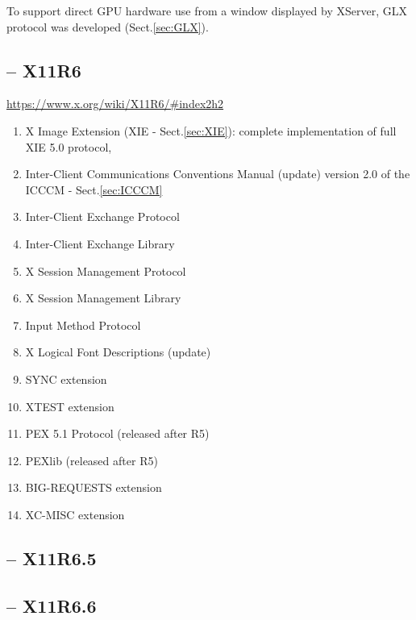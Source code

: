 To support direct GPU hardware use from a window displayed by XServer,
GLX protocol was developed (Sect.\ref{sec:GLX}). 

\subsection{-- X11R6}
\label{sec:X11R6}

\url{https://www.x.org/wiki/X11R6/#index2h2}

\begin{enumerate}
  \item  X Image Extension (XIE - Sect.\ref{sec:XIE}):
  complete implementation of full XIE 5.0 protocol,
  
  \item Inter-Client Communications Conventions Manual (update)
  version 2.0 of the ICCCM - Sect.\ref{sec:ICCCM}
  
  \item Inter-Client Exchange Protocol
  \item Inter-Client Exchange Library
  \item X Session Management Protocol
  \item X Session Management Library
  \item Input Method Protocol
  \item X Logical Font Descriptions (update)
  \item SYNC extension
  \item XTEST extension
  \item PEX 5.1 Protocol (released after R5)
  \item PEXlib (released after R5)
  \item BIG-REQUESTS extension
  \item XC-MISC extension
\end{enumerate}

\subsection{-- X11R6.5}
\label{sec:X11R6.5.1}


\subsection{-- X11R6.6}
\label{sec:X11R6.6}

